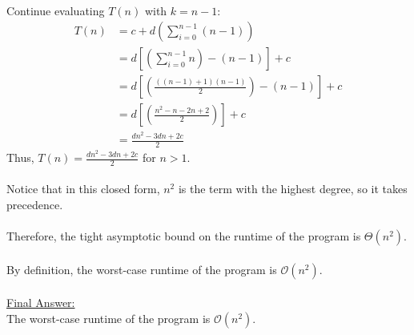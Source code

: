 \documentclass[12pt]{article}
\begin{document}
\\
Continue evaluating $T(n)$ with $k = n - 1$:
\begin{equation*}
    \begin{aligned}
        T(n) &= c + d(\sum_{i = 0}^{n - 1} (n - 1)) \\
        &= d[(\sum_{i = 0}^{n - 1} n) - (n - 1)] + c \\
        &= d[(\frac{((n - 1) + 1)(n - 1)}{2}) - (n - 1)] + c \\
        &= d[(\frac{n^2 - n - 2n + 2}{2})] + c \\
        &= \frac{dn^2 - 3dn + 2c}{2}
    \end{aligned}
\end{equation*}
Thus, $T(n) = \frac{dn^2 - 3dn + 2c}{2}$ for $n > 1$. \\
\\
Notice that in this closed form, $n^2$ is the term with the highest degree, so it takes precedence. \\
\\
Therefore, the tight asymptotic bound on the runtime of the program is $\Theta (n^2)$. \\
\\
By definition, the worst-case runtime of the program is $\mathcal{O} (n^2)$. \\
\\
\underline{Final Answer:} \\
The worst-case runtime of the program is $\mathcal{O} (n^2)$. \\
\pagebreak
\end{document}
